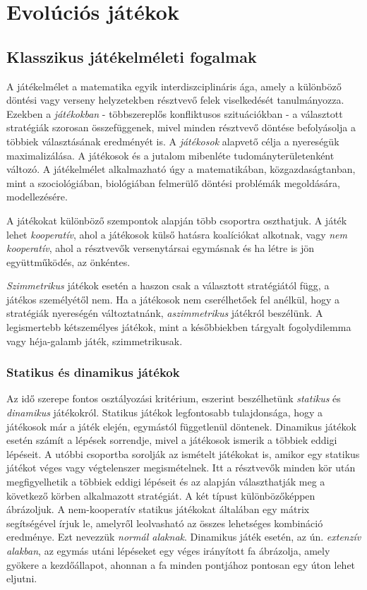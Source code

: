 \section{Evolúciós játékok}

\iffalse 
Általános bemutatás.
Összehasonlítás a "klasszikus" játékelmélettel - külön alcím/fejezet?
 racionális játékosok <-> nem racionális játékosok
 dinamikus - mit jelent?
\fi
\subsection{Klasszikus játékelméleti fogalmak}
A játékelmélet a matematika egyik interdiszciplináris ága, amely a különböző döntési vagy verseny helyzetekben résztvevő felek viselkedését tanulmányozza. Ezekben a \textit{játékokban} - többszereplős konfliktusos szituációkban - a választott stratégiák szorosan összefüggenek, mivel minden résztvevő döntése befolyásolja a többiek választásának eredményét is.\cite{wiki:gametheory} A \textit{játékosok} alapvető célja a nyereségük maximalizálása. A játékosok és a jutalom mibenléte tudományterületenként változó. A játékelmélet alkalmazható úgy a matematikában, közgazdaságtanban, mint a  szociológiában, biológiában felmerülő döntési problémák megoldására, modellezésére.

A játékokat különböző szempontok alapján több csoportra oszthatjuk. A játék lehet \textit{kooperatív}, ahol a játékosok külső hatásra koalíciókat alkotnak, vagy \textit{nem kooperatív}, ahol a résztvevők versenytársai egymásnak és ha létre is jön együttműködés, az önkéntes. 

\textit{Szimmetrikus} játékok esetén a haszon csak a választott stratégiától függ, a játékos személyétől nem. Ha a játékosok nem cserélhetőek fel anélkül, hogy a stratégiák nyereségén változtatnánk, \textit{aszimmetrikus} játékról beszélünk. A legismertebb kétszemélyes játékok, mint a későbbiekben tárgyalt fogolydilemma vagy héja-galamb játék, szimmetrikusak.

\subsubsection{Statikus és dinamikus játékok}
Az idő szerepe fontos osztályozási kritérium, eszerint beszélhetünk \textit{statikus} és \textit{dinamikus} játékokról. Statikus játékok legfontosabb tulajdonsága, hogy a játékosok már a játék elején, egymástól függetlenül döntenek. Dinamikus játékok esetén számít a lépések sorrendje, mivel a játékosok ismerik a többiek eddigi lépéseit. A utóbbi csoportba sorolják az ismételt játékokat is, amikor egy statikus játékot véges vagy végtelenszer megismételnek. Itt a résztvevők minden kör után megfigyelhetik a többiek eddigi lépéseit és az alapján választhatják meg a következő körben alkalmazott stratégiát. A két típust különbözőképpen ábrázoljuk. A nem-kooperatív statikus játékokat általában egy mátrix segítségével írjuk le, amelyről leolvasható az összes lehetséges kombináció eredménye. Ezt nevezzük \textit{normál alaknak}. Dinamikus játék esetén, az ún. \textit{extenzív alakban}, az egymás utáni lépéseket egy véges irányított fa ábrázolja, amely gyökere a kezdőállapot, ahonnan a fa minden pontjához pontosan egy úton lehet eljutni.

